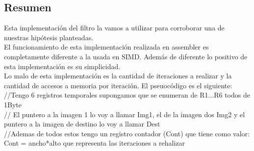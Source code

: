 \subsection{Resumen}
Esta implementación del filtro la vamos a utilizar para corroborar una de nuestras hipótesis planteadas. \\
El funcionamiento de esta implementación realizada en assembler es completamente diferente a la usada en SIMD. Además de diferente lo positivo de esta implementación es su simplicidad. \\
Lo malo de esta implementación es la cantidad de iteraciones a realizar y la cantidad de accesos a memoria por iteración.
El pseuocódigo es el siguiente:\\
//Tengo 6 registros temporales supongamos que se enumeran de R1...R6 todos de 1Byte\\
// El puntero a la imagen 1 lo voy a llamar Img1, el de la imagen dos Img2 y el puntero a la imagen de destino lo voy a llamar Dest\\
//Ademas de todos estos tengo un registro contador (Cont) que tiene como valor: Cont = ancho*alto que representa las iteraciones a rehalizar\\

